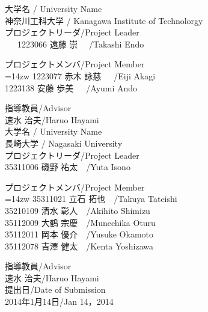 \begin{center}
\newpage
\thispagestyle{empty}
{\normalsize 大学名 / University Name\\[-1mm]神奈川工科大学 / Kanagawa Institute of Technolorgy}\\[5mm]
{\normalsize プロジェクトリーダ/Project Leader}\\[-1mm]
\ \ \ 1223066 遠藤 崇 \ \ /Takashi Endo\\[10mm]
\begin{center}
プロジェクトメンバ/Project Member\\
\leftskip=14zw
1223077 赤木 詠慈\ \ \ /Eiji Akagi\\
1223138 安藤 歩美\ \ \ /Ayumi Ando\\
\end{center}
指導教員/Advisor\\[-1mm]
速水 治夫/Haruo Hayami\\[10mm]

{\normalsize 大学名 / University Name\\[-1mm]長崎大学 / Nagasaki University}\\[5mm]
{\normalsize プロジェクトリーダ/Project Leader}\\[-1mm]
35311006 磯野 祐太\ \  /Yuta Isono\\[10mm]
\begin{center}
プロジェクトメンバ/Project Member\\
\leftskip=14zw
35311021 立石 拓也\ \ /Takuya Tateishi\\
35210109 清水 彰人\ \ /Akihito Shimizu\\
35112009 大鶴 宗慶\ \ /Munechika Oturu\\
35112011 岡本 優介\ \ /Yusuke Okamoto\\
35112078 吉澤 健太\ \ /Kenta Yoshizawa\\
\end{center}
指導教員/Advisor\\
速水 治夫/Haruo Hayami\\[10mm]

提出日/Date of Submission\\
2014年1月14日/Jan 14，2014\\
\end{center}
